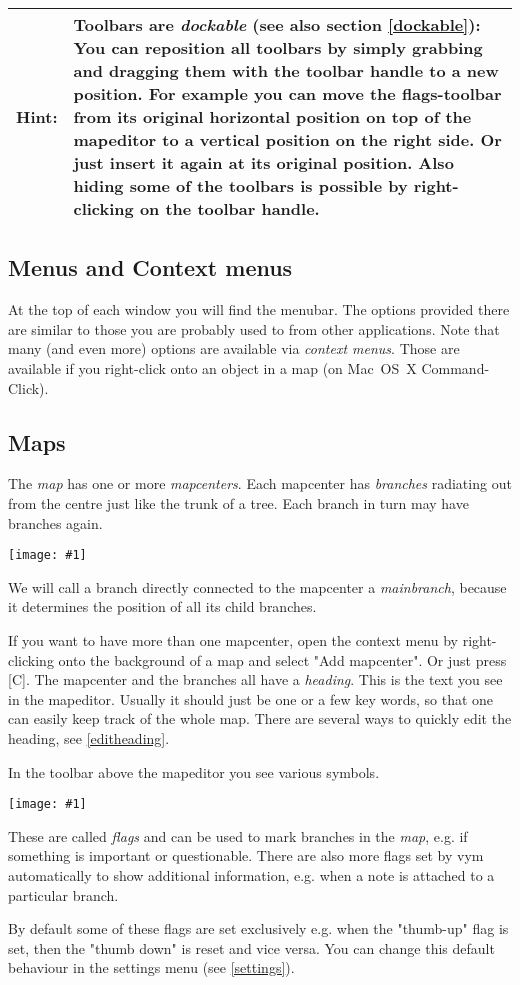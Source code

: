 \documentclass[12pt,a4paper]{article}
\newlength{\maximgwidth}
\newcommand{\maximage}[1]{  
    \begin{center}
        \texttt{[image: \#1]} 
    \end{center}
}
\newcommand{\hint}[1]{
    \begin{center} 
        \begin{tabular}{|rp{12cm}|} \hline
            {\bf Hint}:& #1\\   \hline
        \end{tabular}
            \marginpar{\Huge !} 
    \end{center} 
}
\newcommand{\vym}{{\sc vym }}
\newcommand{\key}[1]{[#1]}
\begin{document}
\hint {Toolbars are {\em dockable} (see also section \ref{dockable}):
You can reposition all toolbars by simply grabbing and dragging them
with the toolbar handle to a new position. For example you can move the
flags-toolbar from its original horizontal position on top of the
mapeditor to a vertical position on the right side.  Or just insert it
again at its original position. Also hiding some of the toolbars is
possible by right-clicking on the toolbar handle.}

\subsection{Menus and Context menus}
At the top of each window you will find the menubar. The options
provided there are similar to those you are probably used to from other
applications. Note that many (and even more) options are available via
{\em context menus}. Those are available if you right-click onto an
object in a map (on Mac~OS~X Command-Click).

\subsection{Maps}
The  {\em map} has one or more {\em mapcenters}.  Each mapcenter has
{\em branches} radiating out from the centre just like the trunk of a
tree. Each branch in turn may have branches again.
\maximage{images/branches.png} 
We will call a branch directly connected to the mapcenter a {\em
mainbranch}, because it determines the position of all its child
branches.

If you want to have more than one mapcenter, open the context menu by
right-clicking onto the background of a map and select "Add mapcenter".
Or just press \key{C}.
The mapcenter and the branches all have a {\em heading}. This is the
text you see in the mapeditor. Usually it should just be one or a few
key words, so that one can easily keep track of the whole map.
There are several ways to quickly edit the heading, see
\ref{editheading}.


In the toolbar above the mapeditor you see various symbols.
    \maximage{images/default-flags.png}
These are called {\em flags} and can be used to mark branches in the
{\em map}, e.g. if something is important or questionable.  There are
also more flags set by \vym automatically to show additional
information, e.g. when a note is attached to a  particular branch.

By default some of these flags are set exclusively e.g. when the 
"thumb-up" flag is set, then the "thumb down" is reset and vice
versa. You can change this default behaviour in the settings menu (see
\ref{settings}).
\end{document}

